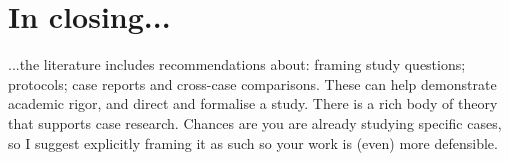 \documentclass{tufte-handout}
\begin{document}
\section{In closing...} 
...the literature includes recommendations about: framing study questions; protocols; case reports and cross-case comparisons. These can help demonstrate academic rigor, and direct and formalise a study. There is a rich body of theory that supports case research. Chances are you are already studying specific cases, so I suggest explicitly framing it as such so your work is (even) more defensible.



\end{document}
